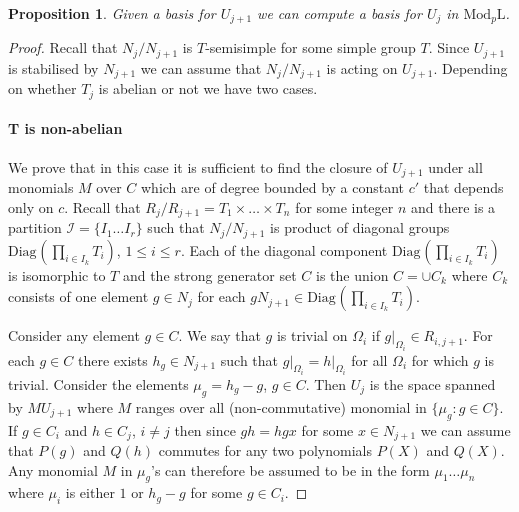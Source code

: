 \documentclass[11pt]{madras}%
\newtheorem{proposition}[theorem]{Proposition}
\theoremstyle{remark}
\newcommand{\ModkL}[1]{{\ensuremath{\mathrm{Mod}_{#1}\mathrm{L}}}}
\newcommand{\pr}[2]{{\ensuremath{\left.{#1}\right\vert_{#2}}}}
\newcommand{\Diag}[2][]{{\ensuremath{\mathrm{Diag}_{{#1}}\left(#2\right)}}}
\begin{document}
\begin{proposition}\label{prop-compute-Uj}
  Given a basis for $U_{j+1}$ we can compute a basis for $U_j$ in
  $\ModkL{p}$.
\end{proposition}
\begin{proof}

  Recall that $N_j/N_{j+1}$ is $T$-semisimple for some simple group
  $T$. Since $U_{j+1}$ is stabilised by $N_{j+1}$ we can assume that
  $N_j/N_{j+1}$ is acting on $U_{j+1}$.  Depending on whether $T_j$ is
  abelian or not we have two cases.


  \paragraph{T is non-abelian}

  We prove that in this case it is sufficient to find the closure of
  $U_{j+1}$ under all monomials $M$ over $C$ which are of degree
  bounded by a constant $c'$ that depends only on $c$. Recall that
  $R_j/R_{j+1} = T_1 \times \ldots \times T_n$ for some integer $n$
  and there is a partition $\mathcal{I} = \{ I_1 \ldots I_r \}$ such
  that $N_j/N_{j+1}$ is product of diagonal groups $\Diag{\prod_{i \in
      I_k} T_i }$, $1 \leq i \leq r$. Each of the diagonal component
  $\Diag{\prod_{i \in I_k} T_i }$ is isomorphic to $T$ and the strong
  generator set $C$ is the union $C = \cup C_k$ where $C_k$ consists
  of one element $g \in N_j$ for each $gN_{j+1} \in \Diag{\prod_{i \in
      I_k} T_i }$.

  Consider any element $g \in C$. We say that $g$ is trivial on
  $\Omega_i$ if $\pr{g}{\Omega_i} \in R_{i,j+1}$. For each $g \in C$
  there exists $h_g \in N_{j+1}$ such that $\pr{g}{\Omega_i} =
  \pr{h}{\Omega_i}$ for all $\Omega_i$ for which $g$ is trivial.
  Consider the elements $\mu_g = h_g - g$, $g \in C$.  Then $U_j$ is
  the space spanned by $M U_{j+1}$ where $M$ ranges over all
  (non-commutative) monomial in $\{ \mu_g : g \in C \}$.  If $g \in
  C_i$ and $h \in C_j$, $i \neq j$ then since $gh = hgx$ for some $x
  \in N_{j+1}$ we can assume that $P(g)$ and $Q(h)$ commutes for any
  two polynomials $P(X)$ and $Q(X)$.  Any monomial $M$ in $\mu_g$'s
  can therefore be assumed to be in the form $\mu_1\ldots \mu_n$ where
  $\mu_i$ is either $1$ or $h_g - g$ for some $g \in C_{i}$.


\end{proof}
\end{document}
